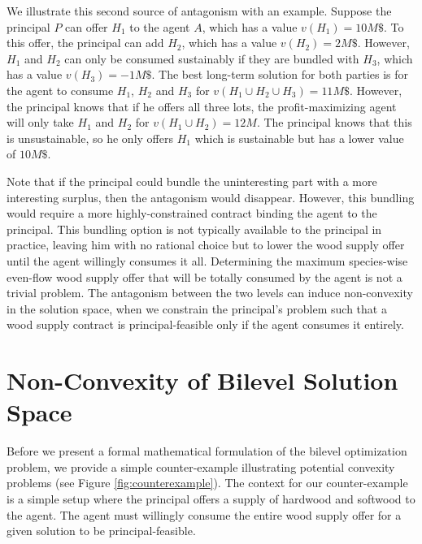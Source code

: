We illustrate this second source of antagonism with an example. %
Suppose the principal $P$ can offer $H_1$ to the agent $A$, which has a value $v(H_1) = 10M\$$. 
To this offer, the principal can add $H_2$, which has a value $v(H_2) = 2M\$$.
However, $H_1$ and $H_2$ can only be consumed sustainably if they are bundled with $H_3$, which has a value $v(H_3) = -1M\$$. 
The best long-term solution for both parties is for the agent to consume $H_1$, $H_2$ and $H_3$ for $v(H_1 \cup H_2 \cup H_3) = 11M\$$.
However, the principal knows that if he offers all three lots, the profit-maximizing agent will only take $H_1$ and $H_2$ for $v(H_1 \cup H_2) = 12M$.
The principal knows that this is unsustainable, so he only offers $H_1$ which is sustainable but has a lower value of $10M\$$.

Note that if the principal could bundle the uninteresting part with a more interesting surplus, then the antagonism would disappear.
However, this bundling would require a more highly-constrained contract binding the agent to the principal.
This bundling option is not typically available to the principal in practice, leaving him with no rational choice but to lower the wood supply offer until the agent willingly consumes it all.
Determining the maximum species-wise even-flow wood supply offer that will be totally consumed by the agent is not a trivial problem.
The antagonism between the two levels can induce non-convexity in the solution space, when we constrain the principal's problem such that a wood supply contract is principal-feasible only if the agent consumes it entirely.


\section{Non-Convexity of Bilevel Solution Space} 


Before we present a formal mathematical formulation of the bilevel optimization problem, we provide a simple counter-example illustrating potential convexity problems (see Figure \ref{fig:counterexample}). The context for our counter-example is a simple setup where the principal offers a supply of hardwood and softwood to the agent. 
The agent must willingly consume the entire wood supply offer for a given solution to be principal-feasible.


